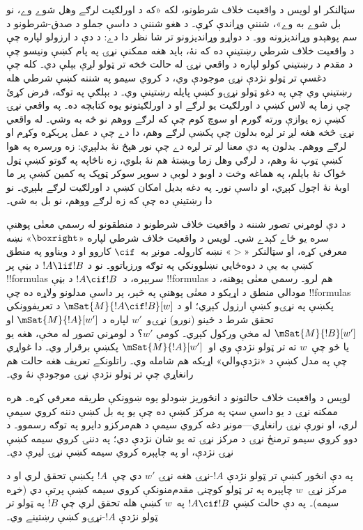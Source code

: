 \documentclass[../../../include/open-logic-section]{subfiles}
\begin{document}


سټالنکر او لويس د واقعيت خلاف شرطونو، لکه «که د اورلګيت لرګے
وهل شوے وے، نو بل شوے به وے»، شننې وړاندې کړې۔ د هغو شننې د
داسې جملو د صدق-شرطونو د سم پوهېدو وړانديزونه وو۔ د دواړو
وړانديزونو تر شا نظر دا دے: د دې د ارزولو لپاره چې د واقعيت
خلاف شرطي رښتينې ده که نۀ، بايد هغه ممکنې نړۍ په پام کښې
ونيسو چې د مقدم د رښتيني کولو لپاره د واقعي نړۍ له حالت څخه
تر ټولو لږې بېلې دي۔ کله چې دغسې تر ټولو نژدې نړۍ موجودې
وي، د کروي سيمو په شننه کښې شرطي هله رښتينې وي چې په دغو ټولو
نړۍو کښې پايله رښتينې وي۔ د بېلګې په توګه، فرض کړئ
چې زما په لاس کښې د اورلګيت يو لرګے او د اورلګيتونو يوه کتابچه
ده۔ په واقعي نړۍ کښې زه يوازې ورته ګورم او سوچ کوم چې که
لرګے ووهم نو څه به وشي۔ له واقعي نړۍ څخه هغه لږ تر لږه بدلون
چې پکښې لرګے وهم، دا دے چې د عمل پرېکړه وکړم او لرګے ووهم۔
بدلون په دې معنا لږ تر لږه دے چې نور هېڅ نۀ بدلېږي: زه ورسره
په هوا کښې ټوپ نۀ وهم، د لرګي وهل زما وېښتۀ هم نۀ بلوي، زه
ناڅاپه په ګوتو کښې ټول ځواک نۀ بايلم، په هماغه وخت د اوبو د
لوبې د سوپر سوکر ټوپک په کمين کښې پر ما اوبۀ نۀ اچول کېږي، او داسې نور۔
په دغه بديل امکان کښې د اورلګيت لرګے بلېږي۔ نو دا رښتينې ده
چې که زه لرګے ووهم، نو بل به شي۔

د دې لومړني تصور شننه د واقعيت خلاف شرطونو د منطقونو له رسمي
معنٰی پوهنې سره يو ځاے کېدے شي۔ لويس د واقعيت خلاف شرطي لپاره
«$\boxright$» نښه معرفي کړه، او سټالنکر «$>$» نښه کاروله۔
مونږ به~$\cif$ کاروو او د ويناوو په منطق کښې به يې د دوه‌ځايي
نښلوونکي په توګه ورزياتوو۔ نو د $!A \lif
!B$ د بڼې پر !!{formula}s سربېره، د~$!A \cif !B$ د بڼې
!!{formula}s هم لرو۔ رسمي معنٰی پوهنه، د مودالي منطق د اړيکو د
معنٰی پوهنې په څېر، پر داسې مدلونو ولاړه ده چې !!{formula}s پکښې
په نړۍو کښې ارزول کېږي؛ او د $\mSat{M}{!A \cif !B}[w]$ د
تعريفوونکي تحقق شرط د ځينو (نورو) نړۍو~$w'$ لپاره د
$\mSat{M}{!A}[w']$ او $\mSat{M}{!B}[w']$ له مخې ورکول کېږي۔
کومې $w'$؟ د لومړني تصور له مخې، هغه يو يا څو چې~$w$ ته تر
ټولو نژدې وي او~$\mSat{M}{!A}[w']$ پکښې برقرار وي۔ دا غواړي
چې په مدل کښې د «نژدې‌والي» اړيکه هم شامله وي۔ راتلونکے
تعريف هغه حالت هم رانغاړي چې تر ټولو نژدې نړۍ موجودې نۀ وي۔

لويس د واقعيت خلاف حالتونو د انځوريز ښودلو يوه ښوونکې طريقه
معرفي کړه۔ هره ممکنه نړۍ د يو داسې سټ په مرکز کښې ده چې يو
په بل کښې دننه کروي سيمې لري، او نورې نړۍ رانغاړي---مونږ دغه
کروي سيمې د هم‌مرکزو دايرو په توګه رسموو۔ د دوو کروي سيمو
ترمنځ نړۍ د مرکز نړۍ ته يو شان نژدې دي؛ په دننۍ کروي سيمه
کښې نړۍ نژدې، او په چاپېره کروي سيمه کښې نړۍ ليرې دي۔
\begin{center}
\end{center}
په دې انځور کښې تر ټولو نژدې $!A$-نړۍ هغه نړۍ $w'$ دي
چې~$!A$ پکښې تحقق لري او د مرکز نړۍ~$w$ چاپېره په تر ټولو
کوچنۍ مقدم‌منونکې کروي سيمه کښې پرتې دي (خړه سيمه)۔
په دې حالت کښې $!A \cif !B$
په~$w$ کښې هله تحقق لري چې $!B$ په ټولو تر ټولو نژدې
$!A$-نړۍو کښې رښتينے وي۔
\end{document}

